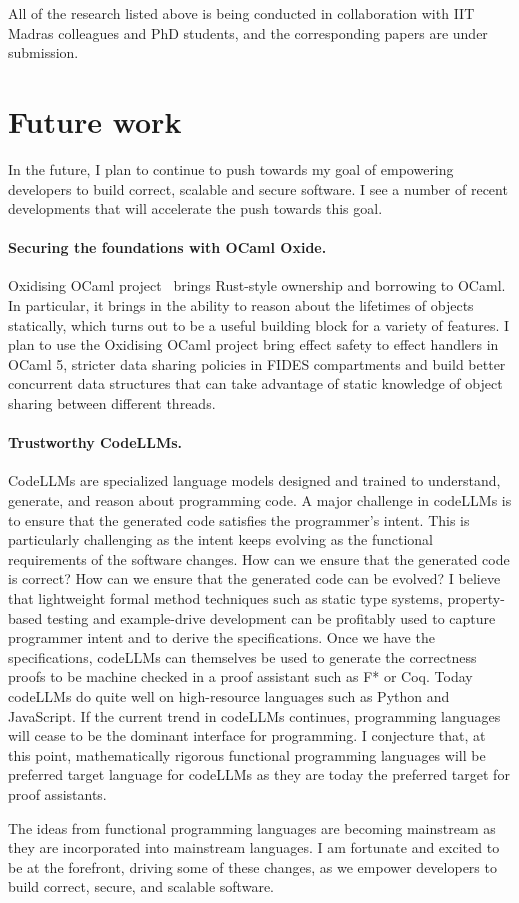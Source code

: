 \documentclass[screen,acmsmall,nonacm]{acmart}
\begin{document}
All of the research listed above is being conducted in collaboration with IIT
Madras colleagues and PhD students, and the corresponding papers are under
submission.

\section{Future work}

In the future, I plan to continue to push towards my goal of empowering
developers to build correct, scalable and secure software. I see a number of
recent developments that will accelerate the push towards this goal.

\paragraph{\bf Securing the foundations with OCaml Oxide.} Oxidising OCaml
project~\cite{oxidising} brings Rust-style ownership and borrowing to OCaml. In
particular, it brings in the ability to reason about the lifetimes of objects
statically, which turns out to be a useful building block for a variety of
features. I plan to use the Oxidising OCaml project bring effect safety to
effect handlers in OCaml 5, stricter data sharing policies in FIDES
compartments and build better concurrent data structures that can take
advantage of static knowledge of object sharing between different threads.

\paragraph{\bf Trustworthy CodeLLMs.} CodeLLMs are specialized language models
designed and trained to understand, generate, and reason about programming
code. A major challenge in codeLLMs is to ensure that the generated code
satisfies the programmer's intent. This is particularly challenging as the
intent keeps evolving as the functional requirements of the software changes.
How can we ensure that the generated code is correct? How can we ensure that
the generated code can be evolved? I believe that lightweight formal method
techniques such as static type systems, property-based testing and
example-drive development can be profitably used to capture programmer intent
and to derive the specifications. Once we have the specifications, codeLLMs can
themselves be used to generate the correctness proofs to be machine checked in
a proof assistant such as F* or Coq. Today codeLLMs do quite well on
high-resource languages such as Python and JavaScript. If the current trend in
codeLLMs continues, programming languages will cease to be the dominant
interface for programming. I conjecture that, at this point, mathematically
rigorous functional programming languages will be preferred target language for
codeLLMs as they are today the preferred target for proof assistants.

The ideas from functional programming languages are becoming mainstream as they
are incorporated into mainstream languages. I am fortunate and excited to be at
the forefront, driving some of these changes, as we empower developers to build
correct, secure, and scalable software.

\newpage



\end{document}
